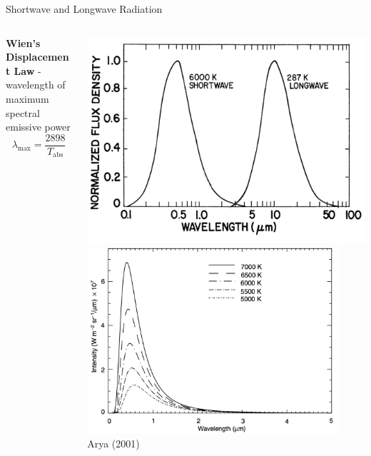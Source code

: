 \begin{frame}{Shortwave and Longwave Radiation}
\begin{columns}[T]
\begin{column}{.5\textwidth}
    \begin{minipage}[c][\textheight][c]{\linewidth}
    \textbf{Wien's Displacement Law} - wavelength of maximum spectral emissive power
    $$\lambda_{\text{max}} = \frac{2898}{T_{\text{abs}}}$$
      \end{minipage}
    \end{column}
    \begin{column}{.5\textwidth}
    \includegraphics[width=1\textwidth]{fig18.png}\newline
      \includegraphics[width=0.9\textwidth]{fig19.png}
	\centering \tiny~\\Arya (2001)
    \end{column}
  \end{columns} 
\end{frame}

